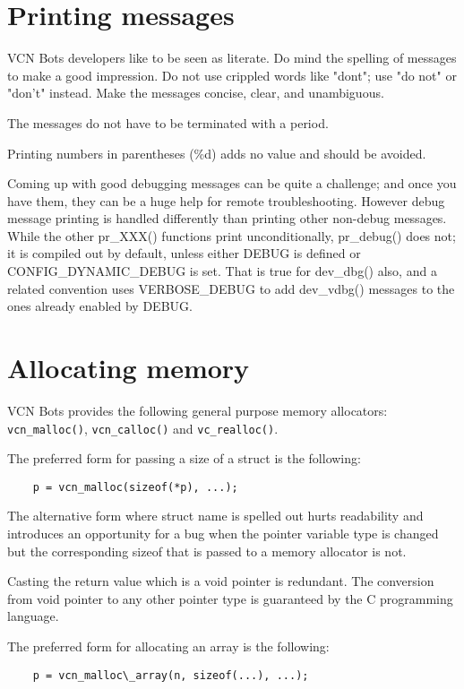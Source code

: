 \documentclass[pdftex,12pt, twocol]{article} %
\begin{document}
\section{Printing messages}

VCN Bots developers like to be seen as literate. Do mind the spelling
of messages to make a good impression. Do not use crippled
words like "dont"; use "do not" or "don't" instead.  Make the messages
concise, clear, and unambiguous.

The messages do not have to be terminated with a period.

Printing numbers in parentheses (\%d) adds no value and should be avoided.

Coming up with good debugging messages can be quite a challenge; and once
you have them, they can be a huge help for remote troubleshooting.  However
debug message printing is handled differently than printing other non-debug
messages.  While the other pr\_XXX() functions print unconditionally,
pr\_debug() does not; it is compiled out by default, unless either DEBUG is
defined or CONFIG\_DYNAMIC\_DEBUG is set.  That is true for dev\_dbg() also,
and a related convention uses VERBOSE\_DEBUG to add dev\_vdbg() messages to
the ones already enabled by DEBUG.

\section{Allocating memory}

VCN Bots provides the following general purpose memory allocators:
\verb+vcn_malloc()+, \verb+vcn_calloc()+ and \verb+vc_realloc()+.

The preferred form for passing a size of a struct is the following:

\begin{verbatim}
	p = vcn_malloc(sizeof(*p), ...);
\end{verbatim}

The alternative form where struct name is spelled out hurts readability and
introduces an opportunity for a bug when the pointer variable type is changed
but the corresponding sizeof that is passed to a memory allocator is not.

Casting the return value which is a void pointer is redundant. The conversion
from void pointer to any other pointer type is guaranteed by the C programming
language.

The preferred form for allocating an array is the following:

\begin{verbatim}
	p = vcn_malloc\_array(n, sizeof(...), ...);
\end{verbatim}
\end{document}
